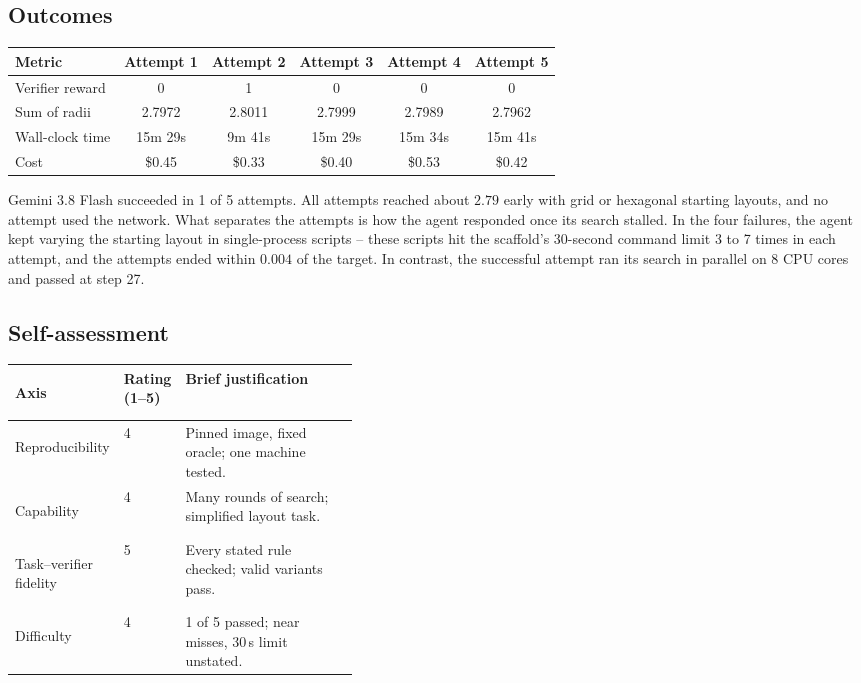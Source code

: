 \documentclass[11pt]{article}
\begin{document}
\subsection*{Outcomes}
\begin{center}
\renewcommand{\arraystretch}{1.3}
\begin{tabularx}{\linewidth}{>{\raggedright\arraybackslash}Xccccc}
  \toprule
  Metric & Attempt 1 & Attempt 2 & Attempt 3 & Attempt 4 & Attempt 5 \\
  \midrule
  Verifier reward & 0 & 1 & 0 & 0 & 0 \\
  Sum of radii & 2.7972 & 2.8011 & 2.7999 & 2.7989 & 2.7962 \\
  Wall-clock time & 15m 29s & 9m 41s & 15m 29s & 15m 34s & 15m 41s \\
  Cost & \$0.45 & \$0.33 & \$0.40 & \$0.53 & \$0.42 \\
  \bottomrule
\end{tabularx}
\end{center}
Gemini 3.8 Flash succeeded in 1 of 5 attempts. All attempts reached about $2.79$ early
with grid or hexagonal starting layouts, and no attempt used the network. What separates
the attempts is how the agent responded once its search stalled. In the four failures,
the agent kept varying the starting layout in single-process scripts -- these scripts
hit the scaffold's 30-second command limit 3 to 7 times in each attempt, and the
attempts ended within $0.004$ of the target. In contrast, the successful attempt ran
its search in parallel on 8 CPU cores and passed at step 27.
\subsection*{Self-assessment}
\begin{center}
\renewcommand{\arraystretch}{1.3}
\begin{tabularx}{\linewidth}{>{\bfseries\raggedright\arraybackslash}p{0.25\linewidth}p{0.15\linewidth}X}
\toprule
Axis & Rating (1--5) & Brief justification \\
\midrule
Reproducibility & 4 & Pinned image, fixed oracle; one machine tested. \\
Capability & 4 & Many rounds of search; simplified layout task. \\
Task--verifier fidelity & 5 & Every stated rule checked; valid variants pass. \\
Difficulty & 4 & 1 of 5 passed; near misses, 30\,s limit unstated. \\
\bottomrule
\end{tabularx}
\end{center}
\end{document}
